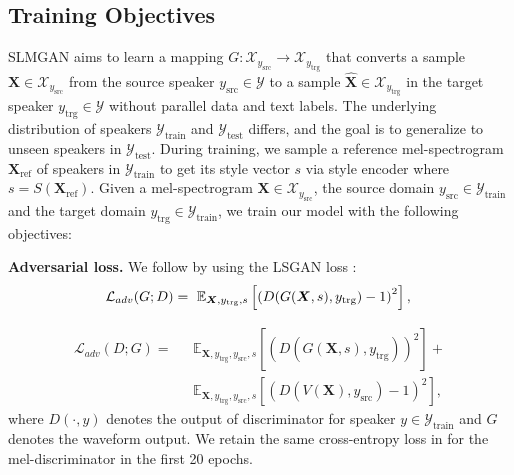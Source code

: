 \documentclass{article}
\newcommand{\parn}[1]{\left(#1\right)}
\begin{document}
\begin{sloppy}
\subsection{Training Objectives}
SLMGAN aims to learn a mapping $G:  \mathcal{X}_{y_{\text{src}}} \rightarrow \mathcal{X}_{y_{\text{trg}}}$ that converts a sample $\bm{X}\in \mathcal{X}_{y_{\text{src}}}$ from the source speaker $y_{\text{src}} \in \mathcal{Y}$ to a sample $\bm{\hat{X}} \in \mathcal{X}_{y_{\text{trg}}}$ in the target speaker $y_{\text{trg}} \in \mathcal{Y}$ without parallel data and text labels. The underlying distribution of speakers $\mathcal{Y}_{\text{train}}$ and $\mathcal{Y}_{\text{test}}$ differs, and the goal is to generalize to unseen speakers in $\mathcal{Y}_{\text{test}}$. During training, we sample a reference mel-spectrogram $\bm{X}_{\text{ref}}$ of speakers in $\mathcal{Y}_{\text{train}}$ to get its style vector $s$ via style encoder where $s = S(\bm{X}_{\text{ref}})$. Given a mel-spectrogram $\bm{X}\in \mathcal{X}_{y_{\text{src}}}$, the source domain $y_{\text{src}} \in \mathcal{Y}_{\text{train}}$ and the target domain $y_{\text{trg}} \in \mathcal{Y}_{\text{train}}$, we train our model with the following objectives:
    
\noindent\textbf{Adversarial loss.} We follow \cite{lee2022bigvgan} by using the LSGAN \cite{mao2017least} loss :
\begin{equation}
      \mathcal{L}_{adv}(G;D) =\text{ } \mathbb{E}_{\bm{X}, y_{\text{trg}}, s}\left[\parn{D(G(\bm{X}, s), y_{\text{trg}}) - 1}^2\right], \\
\end{equation}

    \begin{equation}
    \begin{aligned}    
      \mathcal{L}_{adv}(D;G) =\text{ }
      &\mathbb{E}_{\bm{X}, y_{\text{trg}}, y_{\text{src}}, s}\left[\parn{D(G(\bm{X}, s), y_{\text{trg}})}^2\right] + \\ &\mathbb{E}_{\bm{X}, y_{\text{trg}}, y_{\text{src}}, s}\left[
       \parn{D(V(\bm{X}), y_{\text{src}}) - 1}^2\right],
    \end{aligned}
      \label{eq1}
    \end{equation}
    where $D(\cdot, y)$ denotes the output of discriminator for speaker $y \in \mathcal{Y}_{\text{train}}$ and $G$ denotes the  waveform output. We retain the same cross-entropy loss in \cite{li2021starganv2} for the mel-discriminator in the first 20 epochs. 
    

\end{sloppy}
\end{document}
